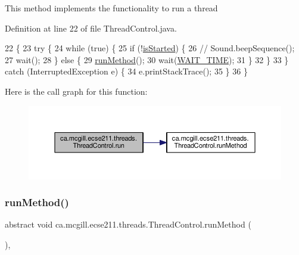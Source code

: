 This method implements the functionality to run a thread 

Definition at line 22 of file Thread\+Control.\+java.


\begin{DoxyCode}
22                                  \{
23     \textcolor{keywordflow}{try} \{
24       \textcolor{keywordflow}{while} (\textcolor{keyword}{true}) \{
25         \textcolor{keywordflow}{if} (!\hyperlink{classca_1_1mcgill_1_1ecse211_1_1threads_1_1_thread_control_a92f4933511db42476e39956246bcf2fe}{isStarted}) \{
26           \textcolor{comment}{// Sound.beepSequence();}
27           wait();
28         \} \textcolor{keywordflow}{else} \{
29           \hyperlink{classca_1_1mcgill_1_1ecse211_1_1threads_1_1_thread_control_a2959c54bdb6c62c9d5569cdf3ccf2418}{runMethod}();
30           wait(\hyperlink{classca_1_1mcgill_1_1ecse211_1_1threads_1_1_thread_control_a395cfe1d73b3ef14da0830ed0a499f82}{WAIT\_TIME});
31         \}
32       \}
33     \} \textcolor{keywordflow}{catch} (InterruptedException e) \{
34       e.printStackTrace();
35     \}
36   \}
\end{DoxyCode}
Here is the call graph for this function\+:\nopagebreak
\begin{figure}[H]
\begin{center}
\leavevmode
\includegraphics[width=350pt]{classca_1_1mcgill_1_1ecse211_1_1threads_1_1_thread_control_a03e743000ea2c37080427565e8ec5f35_cgraph}
\end{center}
\end{figure}
\mbox{\label{classca_1_1mcgill_1_1ecse211_1_1threads_1_1_thread_control_a2959c54bdb6c62c9d5569cdf3ccf2418}} 
\subsubsection{\texorpdfstring{run\+Method()}{runMethod()}}
{\footnotesize\ttfamily abstract void ca.\+mcgill.\+ecse211.\+threads.\+Thread\+Control.\+run\+Method (\begin{DoxyParamCaption}{ }\end{DoxyParamCaption})\hspace{0.3cm}{\ttfamily [abstract]}, {\ttfamily [protected]}}

